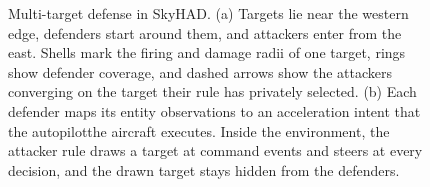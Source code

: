 \begin{figure}[!t]
\centering
\caption{Multi-target defense in SkyHAD. (a) Targets lie near the western edge, defenders start around them, and attackers enter from the east. Shells mark the firing and damage radii of one target, rings show defender coverage, and dashed arrows show the attackers converging on the target their rule has privately selected. (b) Each defender maps its entity observations to an acceleration intent that \ifvehicledetail the autopilot\else the aircraft\fi{} executes. Inside the environment, the attacker rule draws a target at command events and steers at every decision, and the drawn target stays hidden from the defenders.}
\label{fig:fw-scene}
\end{figure}

